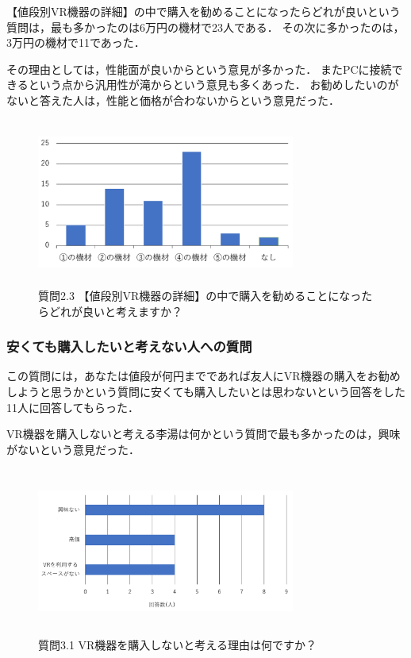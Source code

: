 \documentclass[12pt,a4j]{ltjsarticle}
\begin{document}
【値段別VR機器の詳細】の中で購入を勧めることになったらどれが良いという質問は，最も多かったのは6万円の機材で23人である．
その次に多かったのは，3万円の機材で11であった．

その理由としては，性能面が良いからという意見が多かった．
またPCに接続できるという点から汎用性が滝からという意見も多くあった．
お勧めしたいのがないと答えた人は，性能と価格が合わないからという意見だった．

\begin{figure}[h]
\begin{center}
 \includegraphics[clip,width=85mm,height=55mm]{
 アンケート2_2_3.pdf}
\end{center}
 \caption{質問2.3 【値段別VR機器の詳細】の中で購入を勧めることになったらどれが良いと考えますか？}
 \label{fig:アンケート2_2_3.pdf}
\end{figure}

\subsubsection{安くても購入したいと考えない人への質問}
この質問には，あなたは値段が何円までであれば友人にVR機器の購入をお勧めしようと思うかという質問に安くても購入したいとは思わないという回答をした11人に回答してもらった．

VR機器を購入しないと考える李湯は何かという質問で最も多かったのは，興味がないという意見だった．

\begin{figure}[h]
\begin{center}
 \includegraphics[clip,width=85mm,height=55mm]{
 アンケート2_3_1.pdf}
\end{center}
 \caption{質問3.1 VR機器を購入しないと考える理由は何ですか？}
 \label{fig:アンケート2_3_1.pdf}
\end{figure}
\end{document}
